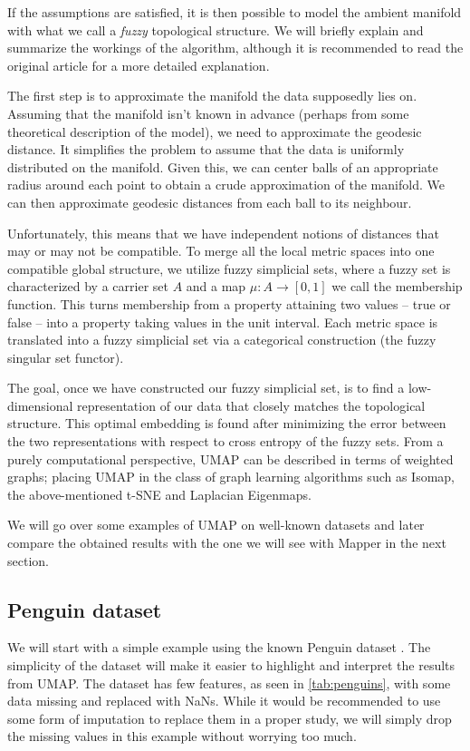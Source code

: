 If the assumptions are satisfied, it is then possible to model the ambient manifold with what we call a \textit{fuzzy} topological structure. We will briefly explain and summarize the workings of the algorithm, although it is recommended to read the original article \cite{mcinnes2020umapuniformmanifoldapproximation} for a more detailed explanation.

The first step is to approximate the manifold the data supposedly lies on. Assuming that the manifold isn't known in advance (perhaps from some theoretical description of the model), we need to approximate the geodesic distance. It simplifies the problem to assume that the data is uniformly distributed on the manifold. Given this, we can center balls of an appropriate radius around each point to obtain a crude approximation of the manifold. We can then approximate geodesic distances from each ball to its neighbour.

Unfortunately, this means that we have independent notions of distances that may or may not be compatible. To merge all the local metric spaces into one compatible global structure, we utilize fuzzy simplicial sets, where a fuzzy set is characterized by a carrier set $A$ and a map $\mu: A \to [0,1]$ we call the membership function. This turns membership from a property attaining two values -- true or false -- into a property taking values in the unit interval. Each metric space is translated into a fuzzy simplicial set via a categorical construction (the fuzzy singular set functor).

The goal, once we have constructed our fuzzy simplicial set, is to find a low-dimensional representation of our data that closely matches the topological structure. This optimal embedding is found after minimizing the error between the two representations with respect to cross entropy of the fuzzy sets. From a purely computational perspective, UMAP can be described in terms of weighted graphs; placing UMAP in the class of graph learning algorithms such as Isomap, the above-mentioned t-SNE and Laplacian Eigenmaps.

We will go over some examples of UMAP on well-known datasets and later compare the obtained results with the one we will see with Mapper in the next section.

\subsection{Penguin dataset}
We will start with a simple example using the known Penguin dataset \cite{10.1371/journal.pone.0090081}. The simplicity of the dataset will make it easier to highlight and interpret the results from UMAP. The dataset has few features, as seen in \ref{tab:penguins}, with some data missing and replaced with NaNs. While it would be recommended to use some form of imputation to replace them in a proper study, we will simply drop the missing values in this example without worrying too much.

